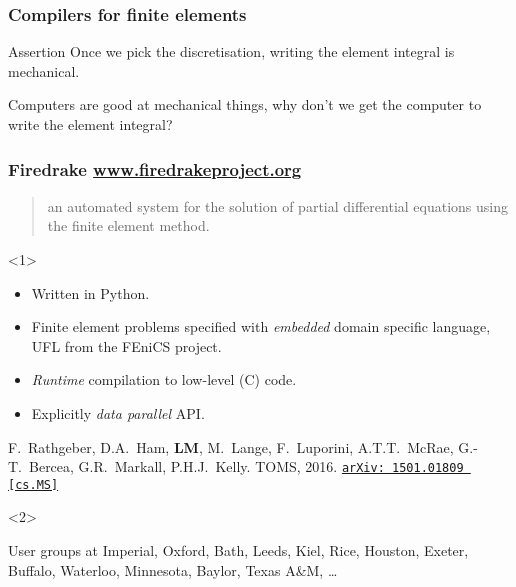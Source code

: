\documentclass[presentation]{beamer}
\newcommand{\arxivlink}[2]{%
  \href{http://www.arxiv.org/abs/#1}%
  {\texttt{arXiv:\,#1\,[#2]}}%
}
\begin{document}
\begin{frame}
  \frametitle{Compilers for finite elements}
  \begin{block}{Assertion}
    Once we pick the discretisation, writing the element integral is mechanical.
  \end{block}
  \begin{corollary}
    Computers are good at mechanical things, why don't we get the
    computer to write the element integral?
  \end{corollary}
\end{frame}

\begin{frame}
  \frametitle{Firedrake \url{www.firedrakeproject.org}}

  \begin{quote}
    {\normalfont [\ldots]} an automated system for the solution of partial
    differential equations using the finite element method.
  \end{quote}

  \begin{onlyenv}<1>
    \begin{itemize}
    \item Written in Python.
    \item Finite element problems specified with \emph{embedded}
      domain specific language, UFL \parencite{Alnaes:2014} from the
      FEniCS project.
    \item \emph{Runtime} compilation to low-level (C) code.
    \item Explicitly \emph{data parallel} API.
    \end{itemize}

    \begin{flushright}
      {\scriptsize F.~Rathgeber, D.A.~Ham, \textbf{LM}, M.~Lange,
        F.~Luporini, A.T.T.~McRae, G.-T.~Bercea, G.R.~Markall,
        P.H.J.~Kelly. TOMS,
        2016. \arxivlink{1501.01809}{cs.MS}\nocite{Rathgeber:2016}}
    \end{flushright}
  \end{onlyenv}
  \begin{onlyenv}<2>
    \begin{block}{User groups at}
      Imperial, Oxford, Bath, Leeds, Kiel, Rice, Houston, Exeter, Buffalo,
      Waterloo, Minnesota, Baylor, Texas A\&M, \dots
    \end{block}
  \end{onlyenv}
\end{frame}
\end{document}
